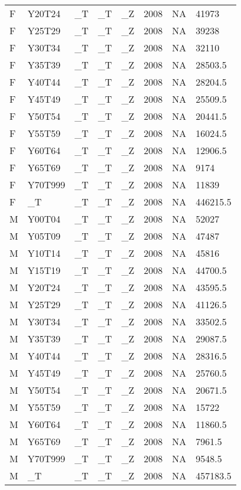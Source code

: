 \begin{longtable}[t]{llllllll}
F & Y20T24 & \_T & \_T & \_Z & 2008 & NA & 41973\\
F & Y25T29 & \_T & \_T & \_Z & 2008 & NA & 39238\\
F & Y30T34 & \_T & \_T & \_Z & 2008 & NA & 32110\\
F & Y35T39 & \_T & \_T & \_Z & 2008 & NA & 28503.5\\
F & Y40T44 & \_T & \_T & \_Z & 2008 & NA & 28204.5\\
\addlinespace
F & Y45T49 & \_T & \_T & \_Z & 2008 & NA & 25509.5\\
F & Y50T54 & \_T & \_T & \_Z & 2008 & NA & 20441.5\\
F & Y55T59 & \_T & \_T & \_Z & 2008 & NA & 16024.5\\
F & Y60T64 & \_T & \_T & \_Z & 2008 & NA & 12906.5\\
F & Y65T69 & \_T & \_T & \_Z & 2008 & NA & 9174\\
\addlinespace
F & Y70T999 & \_T & \_T & \_Z & 2008 & NA & 11839\\
F & \_T & \_T & \_T & \_Z & 2008 & NA & 446215.5\\
M & Y00T04 & \_T & \_T & \_Z & 2008 & NA & 52027\\
M & Y05T09 & \_T & \_T & \_Z & 2008 & NA & 47487\\
M & Y10T14 & \_T & \_T & \_Z & 2008 & NA & 45816\\
\addlinespace
M & Y15T19 & \_T & \_T & \_Z & 2008 & NA & 44700.5\\
M & Y20T24 & \_T & \_T & \_Z & 2008 & NA & 43595.5\\
M & Y25T29 & \_T & \_T & \_Z & 2008 & NA & 41126.5\\
M & Y30T34 & \_T & \_T & \_Z & 2008 & NA & 33502.5\\
M & Y35T39 & \_T & \_T & \_Z & 2008 & NA & 29087.5\\
\addlinespace
M & Y40T44 & \_T & \_T & \_Z & 2008 & NA & 28316.5\\
M & Y45T49 & \_T & \_T & \_Z & 2008 & NA & 25760.5\\
M & Y50T54 & \_T & \_T & \_Z & 2008 & NA & 20671.5\\
M & Y55T59 & \_T & \_T & \_Z & 2008 & NA & 15722\\
M & Y60T64 & \_T & \_T & \_Z & 2008 & NA & 11860.5\\
\addlinespace
M & Y65T69 & \_T & \_T & \_Z & 2008 & NA & 7961.5\\
M & Y70T999 & \_T & \_T & \_Z & 2008 & NA & 9548.5\\
M & \_T & \_T & \_T & \_Z & 2008 & NA & 457183.5\\

\end{longtable}
